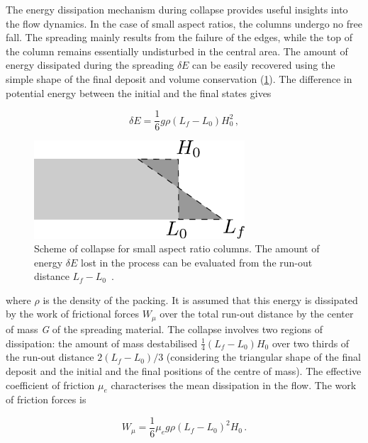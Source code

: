 The energy dissipation mechanism during collapse provides useful insights 
into the flow dynamics. In the case of small aspect ratios, the columns undergo 
no free fall. The spreading mainly results from the failure of the edges, while 
the top of the column remains essentially undisturbed in the central area. 
The amount of energy dissipated during the 
spreading $\delta E$ can be easily recovered using the simple shape of the 
final deposit and volume conservation (\cref{fig:volume_conservation}). The 
difference in potential energy between the initial and the final states gives

\begin{equation}
\delta E = \frac{1}{6} g \rho (L_f - L_0) H_0^2 \,,
\end{equation}

\begin{figure}
\centering
\includegraphics[width=0.7\textwidth]{volume_conservation}
\caption[Scheme of collapse for small aspect ratio columns.]{Scheme of collapse 
for small aspect ratio columns. The amount of 
energy $\delta E$ lost in the process can be evaluated
from the run-out distance $L_f - L_0$~\citep{Staron2007a}.}
\label{fig:volume_conservation}
\end{figure}

where $\rho$ is the density of the packing. It is assumed that this energy is 
dissipated by the work of frictional forces $W_{\mu}$ over the total run-out 
distance by the center of mass \textit{G} of the spreading 
material. The collapse involves two regions of dissipation: the amount of mass 
destabilised $\frac{1}{4}(L_f - 
L_0) H_0$ over two thirds of the run-out distance $2(L_f - L_0) / 3$ 
(considering
the triangular shape of the final deposit and the initial and the final 
positions of the centre of mass). The effective coefficient of friction $\mu_e$ 
characterises the mean dissipation in the flow. The work of friction forces is 

\begin{equation}
W_{\mu} = \frac{1}{6} \mu_e g \rho (L_f - L_0)^2 H_0 \,.
\end{equation}

